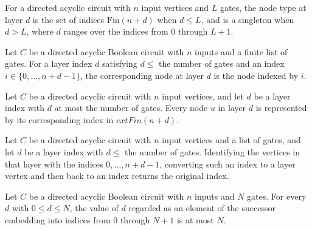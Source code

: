 \begin{definition}
\label{BoolCircuit.DAGCircuit.layerNodes}
\leanok
For a directed acyclic circuit with $n$ input vertices and $L$ gates, the node type at
layer $d$ is the set of indices $\mathrm{Fin}(n+d)$ when $d\le L$, and is a singleton
when $d>L$, where $d$ ranges over the indices from $0$ through $L+1$.
\end{definition}

\begin{definition}
\label{BoolCircuit.DAGCircuit.toNode}
\leanok
{}
Let $C$ be a directed acyclic Boolean circuit with $n$ inputs and a finite list of
gates. For a layer index $d$ satisfying $d\leq$ the number of gates and an index
$i\in\{0,\ldots,n+d-1\}$, the corresponding node at layer $d$ is the node indexed by
$i$.
\end{definition}

\begin{definition}
\label{BoolCircuit.DAGCircuit.ofNode}
\leanok
{}
Let $C$ be a directed acyclic circuit with $n$ input vertices, and let $d$ be a layer
index with $d$ at most the number of gates. Every node $u$ in layer $d$ is represented
by its corresponding index in $	ext{Fin}(n+d)$.
\end{definition}

\begin{theorem}
\label{BoolCircuit.DAGCircuit.ofNode_toNode}
\leanok
{}
Let $C$ be a directed acyclic circuit with $n$ input vertices and a list of gates, and
let $d$ be a layer index with $d\le$ the number of gates. Identifying the vertices in
that layer with the indices $0,\ldots,n+d-1$, converting such an index to a layer vertex
and then back to an index returns the original index.
\end{theorem}

\begin{theorem}
\label{BoolCircuit.DAGCircuit.castSucc_le}
\leanok
{}
Let $C$ be a directed acyclic Boolean circuit with $n$ inputs and $N$ gates. For every
$d$ with $0\le d\le N$, the value of $d$ regarded as an element of the successor
embedding into indices from $0$ through $N+1$ is at most $N$.
\end{theorem}

